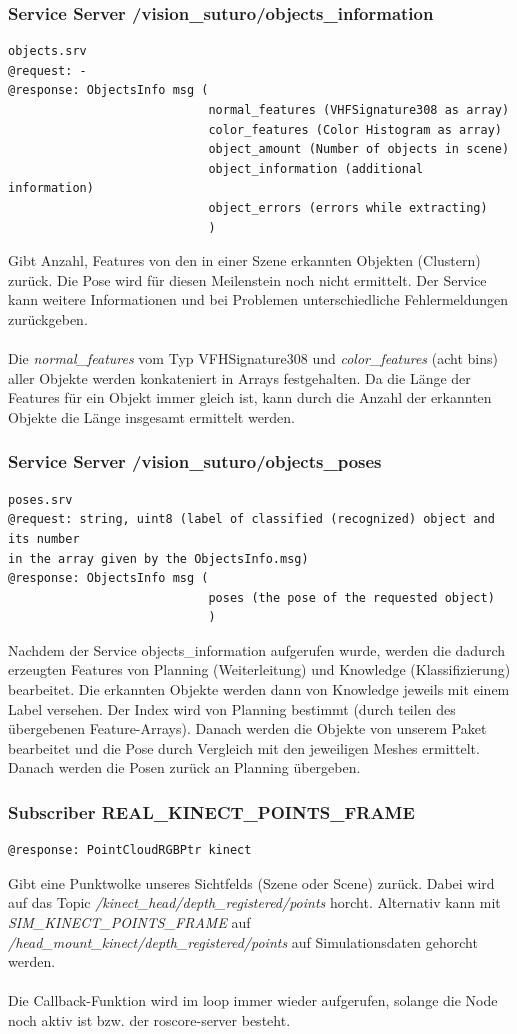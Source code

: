 \documentclass{suturo}
\begin{document}
\subsubsection{Service Server /vision\_suturo/objects\_information}
\begin{verbatim}
objects.srv
@request: -
@response: ObjectsInfo msg (
							normal_features (VHFSignature308 as array)
							color_features (Color Histogram as array)
							object_amount (Number of objects in scene)
							object_information (additional information)
							object_errors (errors while extracting)
							)
\end{verbatim}
Gibt Anzahl, Features von den in einer Szene erkannten Objekten (Clustern) zurück. Die Pose wird für diesen Meilenstein noch nicht ermittelt. Der Service kann weitere Informationen und bei Problemen unterschiedliche Fehlermeldungen zurückgeben.
\\ \\
Die \textit{normal\_features} vom Typ VFHSignature308 und \textit{color\_features} (acht bins) aller Objekte werden konkateniert in Arrays festgehalten. 
Da die Länge der Features für ein Objekt immer gleich ist, kann durch die Anzahl der erkannten Objekte die Länge insgesamt ermittelt werden.

\subsubsection{Service Server /vision\_suturo/objects\_poses}
\begin{verbatim}
poses.srv
@request: string, uint8 (label of classified (recognized) object and its number
in the array given by the ObjectsInfo.msg)
@response: ObjectsInfo msg (
							poses (the pose of the requested object)
							)
\end{verbatim}
Nachdem der Service objects\_information aufgerufen wurde, werden die dadurch erzeugten Features von Planning (Weiterleitung) und Knowledge (Klassifizierung) bearbeitet. Die erkannten Objekte werden dann von Knowledge jeweils mit einem Label versehen. Der Index wird von Planning bestimmt (durch teilen des übergebenen Feature-Arrays). Danach werden die Objekte von unserem Paket bearbeitet und die Pose durch Vergleich mit den jeweiligen Meshes ermittelt. Danach werden die Posen zurück an Planning übergeben.

\subsubsection{Subscriber REAL\_KINECT\_POINTS\_FRAME}
\begin{verbatim}
@response: PointCloudRGBPtr kinect
\end{verbatim}
Gibt eine Punktwolke unseres Sichtfelds (Szene oder Scene) zurück. Dabei wird auf das Topic \textit{/kinect\_head/depth\_registered/points} horcht. Alternativ kann mit \textit{SIM\_KINECT\_POINTS\_FRAME} auf \textit{/head\_mount\_kinect/depth\_registered/points} auf Simulationsdaten gehorcht werden.
\\ \\
Die Callback-Funktion wird im loop immer wieder aufgerufen, solange die Node noch aktiv ist bzw. der roscore-server besteht.
\end{document}
